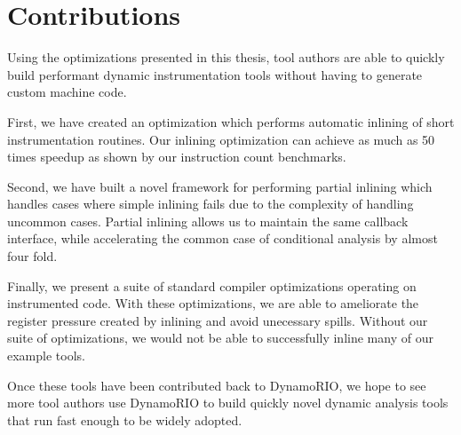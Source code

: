 \chapter{Contributions}
\label{sec:contributions}

Using the optimizations presented in this thesis, tool authors are able to
quickly build performant dynamic instrumentation tools without having to
generate custom machine code.

First, we have created an optimization which performs automatic inlining of
short instrumentation routines.  Our inlining optimization can achieve as much
as 50 times speedup as shown by our instruction count benchmarks.

Second, we have built a novel framework for performing partial inlining which
handles cases where simple inlining fails due to the complexity of handling
uncommon cases.  Partial inlining allows us to maintain the same callback
interface, while accelerating the common case of conditional analysis by almost
four fold.

Finally, we present a suite of standard compiler optimizations operating on
instrumented code.  With these optimizations, we are able to ameliorate the
register pressure created by inlining and avoid unecessary spills.  Without our
suite of optimizations, we would not be able to successfully inline many of our
example tools.

Once these tools have been contributed back to DynamoRIO, we hope to see more
tool authors use DynamoRIO to build quickly novel dynamic analysis tools that
run fast enough to be widely adopted.
